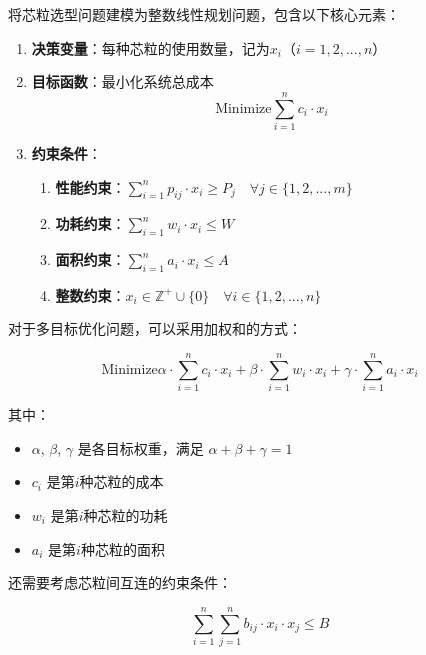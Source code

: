 \documentclass[bachelor]{thesis-uestc}
\begin{document}
将芯粒选型问题建模为整数线性规划问题，包含以下核心元素：

\begin{enumerate}
    \item \textbf{决策变量}：每种芯粒的使用数量，记为$x_i$（$i = 1, 2, ..., n$）
    
    \item \textbf{目标函数}：最小化系统总成本
    \begin{equation}
    \text{Minimize} \sum_{i=1}^{n} c_i \cdot x_i
    \end{equation}
    
    \item \textbf{约束条件}：
    \begin{enumerate}
        \item \textbf{性能约束}：$\sum_{i=1}^{n} p_{ij} \cdot x_i \geq P_j \quad \forall j \in \{1,2,...,m\}$
        \item \textbf{功耗约束}：$\sum_{i=1}^{n} w_i \cdot x_i \leq W$
        \item \textbf{面积约束}：$\sum_{i=1}^{n} a_i \cdot x_i \leq A$
        \item \textbf{整数约束}：$x_i \in \mathbb{Z}^+ \cup \{0\} \quad \forall i \in \{1,2,...,n\}$
    \end{enumerate}
\end{enumerate}

对于多目标优化问题，可以采用加权和的方式：

\begin{equation}
\text{Minimize} \alpha \cdot \sum_{i=1}^{n} c_i \cdot x_i + \beta \cdot \sum_{i=1}^{n} w_i \cdot x_i + \gamma \cdot \sum_{i=1}^{n} a_i \cdot x_i
\end{equation}

其中：
\begin{itemize}
    \item $\alpha$, $\beta$, $\gamma$ 是各目标权重，满足 $\alpha + \beta + \gamma = 1$
    \item $c_i$ 是第$i$种芯粒的成本
    \item $w_i$ 是第$i$种芯粒的功耗
    \item $a_i$ 是第$i$种芯粒的面积
\end{itemize}

还需要考虑芯粒间互连的约束条件：

\begin{equation}
\sum_{i=1}^{n}\sum_{j=1}^{n} b_{ij} \cdot x_i \cdot x_j \leq B
\end{equation}
\end{document}

